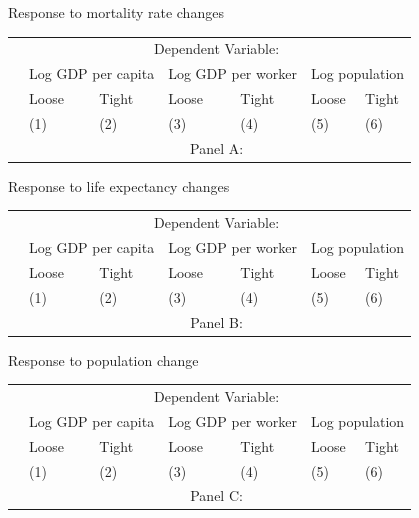 \documentclass[10pt, xcolor=dvipsnames]{beamer}
\begin{document}
\begin{frame}{Response to mortality rate changes}

{\footnotesize
\begin{tabularx}{\textwidth}{lXXXXXX}
\midrule
 & \multicolumn{6}{c}{Dependent Variable:} \\ \cmidrule(lr){2-7}
 & \multicolumn{2}{c}{Log GDP per capita} & \multicolumn{2}{c}{Log GDP per worker} & \multicolumn{2}{c}{Log population} \\ \cmidrule(lr){2-3} \cmidrule(lr){4-5} \cmidrule(lr){6-7}
 & Loose & Tight & Loose & Tight & Loose & Tight \\
 & (1) & (2) & (3) & (4) & (5) & (6) \\
\midrule
 & \multicolumn{6}{c}{Panel A:} \\ \cmidrule(lr){2-7}

\midrule

\end{tabularx}
}
\end{frame}

\begin{frame}{Response to life expectancy changes}

{\footnotesize
\begin{tabularx}{\textwidth}{lXXXXXX}
\midrule
 & \multicolumn{6}{c}{Dependent Variable:} \\ \cmidrule(lr){2-7}
 & \multicolumn{2}{c}{Log GDP per capita} & \multicolumn{2}{c}{Log GDP per worker} & \multicolumn{2}{c}{Log population} \\ \cmidrule(lr){2-3} \cmidrule(lr){4-5} \cmidrule(lr){6-7}
 & Loose & Tight & Loose & Tight & Loose & Tight \\
 & (1) & (2) & (3) & (4) & (5) & (6) \\
\midrule
 & \multicolumn{6}{c}{Panel B:} \\ \cmidrule(lr){2-7}

\midrule

\end{tabularx}
}
\end{frame}

\begin{frame}{Response to population change}

{\footnotesize
\begin{tabularx}{\textwidth}{lXXXXXX}
\midrule
 & \multicolumn{6}{c}{Dependent Variable:} \\ \cmidrule(lr){2-7}
 & \multicolumn{2}{c}{Log GDP per capita} & \multicolumn{2}{c}{Log GDP per worker} & \multicolumn{2}{c}{Log population} \\ \cmidrule(lr){2-3} \cmidrule(lr){4-5} \cmidrule(lr){6-7}
 & Loose & Tight & Loose & Tight & Loose & Tight \\
 & (1) & (2) & (3) & (4) & (5) & (6) \\
\midrule
 & \multicolumn{6}{c}{Panel C:} \\ \cmidrule(lr){2-7}

\midrule

\end{tabularx}
}
\end{frame}
\end{document}
